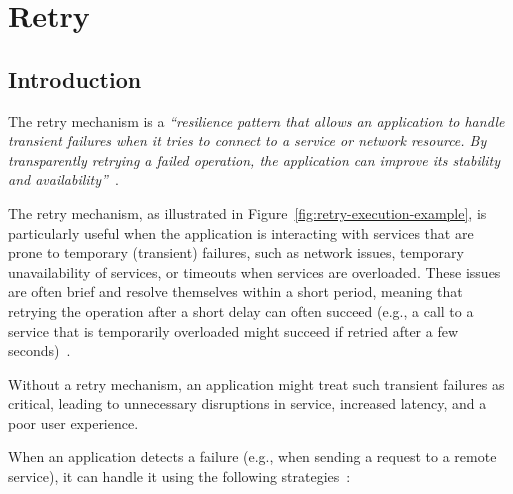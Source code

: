\chapter{Retry}\label{ch:retry}


\section{Introduction}\label{sec:retry-context}

The retry mechanism is a \textit{\enquote{resilience pattern
that allows an application to handle transient failures when it tries to connect to a service or network resource.
By transparently retrying a failed operation,
    the application can improve its stability and availability}}~\cite{microsoft-retry-pattern}.

The retry mechanism, as illustrated in Figure~\ref{fig:retry-execution-example},
is particularly useful when the application is interacting with services that are prone to temporary
(transient) failures, such as network issues,
temporary unavailability of services, or timeouts when services are overloaded.
These issues are often brief and resolve themselves within a short period,
meaning that retrying the operation after a short delay can often succeed
(e.g.,
a call to a service that is temporarily overloaded might succeed
if retried after a few seconds)~\cite{microsoft-retry-pattern}.

Without a retry mechanism, an application might treat such transient failures as critical,
leading to unnecessary disruptions in service, increased latency, and a poor user experience.

When an application detects a failure (e.g., when sending a request to a remote service), it can handle it using the following strategies~\cite{microsoft-retry-pattern}:

